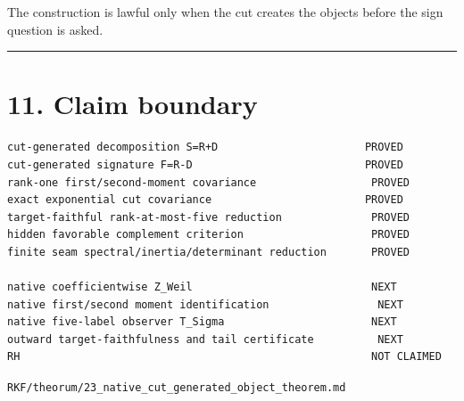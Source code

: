 The construction is lawful only when the cut creates the objects before the
sign question is asked.

\begin{center}\rule{0.5\linewidth}{0.5pt}\end{center}

\hypertarget{claim-boundary}{%
\section{11. Claim boundary}\label{claim-boundary}}

\begin{verbatim}
cut-generated decomposition S=R+D                       PROVED
cut-generated signature F=R-D                           PROVED
rank-one first/second-moment covariance                  PROVED
exact exponential cut covariance                        PROVED
target-faithful rank-at-most-five reduction              PROVED
hidden favorable complement criterion                    PROVED
finite seam spectral/inertia/determinant reduction       PROVED

native coefficientwise Z_Weil                            NEXT
native first/second moment identification                 NEXT
native five-label observer T_Sigma                       NEXT
outward target-faithfulness and tail certificate          NEXT
RH                                                       NOT CLAIMED
\end{verbatim}

\begin{flushright}\small\texttt{RKF/theorum/23\_native\_cut\_generated\_object\_theorem.md}\end{flushright}
